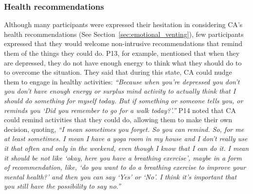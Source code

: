     \subsubsection{Health recommendations}
        Although many participants were expressed their hesitation in considering \ac{CA}'s health recommendations (See Section~\ref{sec:emotional_venting}), few participants expressed that they would welcome non-intrusive recommendations that remind them of the things they could do.
        P13, for example, mentioned that when they are depressed, they do not have enough energy to think what they should do to to overcome the situation. They said that during this state, \ac{CA} could nudge them to engage in healthy activities:
        \textit{``Because when you're depressed you don't you don't have enough energy or surplus mind activity to actually think that I should do something for myself today. But if something or someone tells you, or reminds you `Did you remember to go for a walk today?'.'' }
        P14 noted that \ac{CA} could remind activities that they could do, allowing them to make their own decision, quoting,
        \textit{``I mean sometimes you forget. So you can remind. So, for me at least sometimes. I mean I have a yoga room in my house and I don't really use it that often and only in the weekend, even though I know that I can do it. 
        I mean it should be not like `okay, here you have a breathing exercise', maybe in a form of recommendation, like, `do you want to do a breathing exercise to improve your mental health?' and then you can say `Yes' or `No'. I think it's important that you still have the possibility to say no.''}
        

